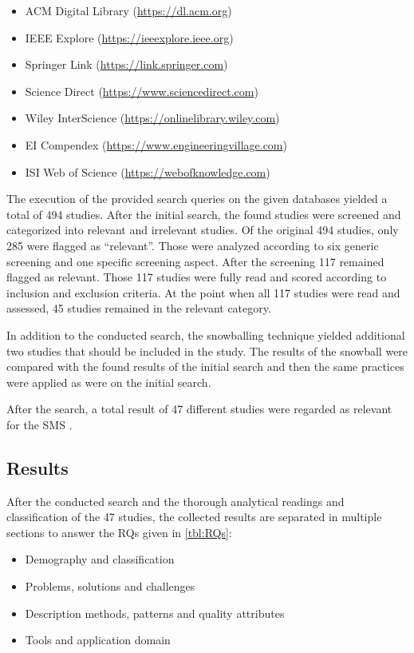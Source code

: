 \begin{itemize}
    \item ACM Digital Library (\url{https://dl.acm.org})
    \item IEEE Explore (\url{https://ieeexplore.ieee.org})
    \item Springer Link (\url{https://link.springer.com})
    \item Science Direct (\url{https://www.sciencedirect.com})
    \item Wiley InterScience (\url{https://onlinelibrary.wiley.com})
    \item EI Compendex (\url{https://www.engineeringvillage.com})
    \item ISI Web of Science (\url{https://webofknowledge.com})
\end{itemize}

The execution of the provided search queries on the given databases
yielded a total of 494 studies. After the initial search, the found
studies were screened and categorized into relevant and irrelevant studies.
Of the original 494 studies, only 285 were flagged as ``relevant''.
Those were analyzed according to six generic screening and one specific
screening aspect. After the screening 117 remained flagged as relevant.
Those 117 studies were fully read and scored according to inclusion and
exclusion criteria. At the point when all 117 studies were read and
assessed, 45 studies remained in the relevant category.

In addition to the conducted search, the snowballing technique
yielded additional two studies that should be included in the study.
The results of the snowball were compared with the found results of the
initial search and then the same practices were applied as were on the
initial search.

After the search, a total result of 47 different studies were regarded
as relevant for the SMS \cite{waseem:SMSMSADevOps}.


\subsection{Results}

After the conducted search and the thorough analytical readings and classification
of the 47 studies, the collected results are separated in multiple sections
to answer the RQs given in \autoref{tbl:RQs}:

\begin{itemize}
    \item Demography and classification
    \item Problems, solutions and challenges
    \item Description methods, patterns and quality attributes
    \item Tools and application domain
\end{itemize}


